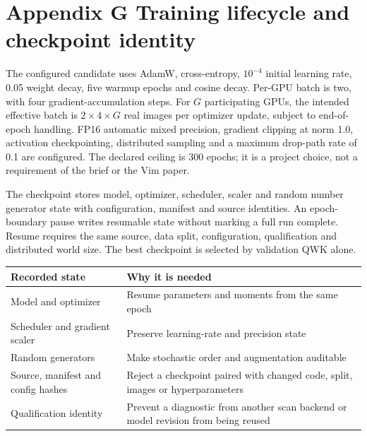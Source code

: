 \newpage
\section*{\color{ink}Appendix G \quad Training lifecycle and checkpoint identity}
The configured candidate uses AdamW, cross-entropy, $10^{-4}$ initial
learning rate, 0.05 weight decay, five warmup epochs and cosine decay.
Per-GPU batch is two, with four gradient-accumulation steps. For $G$
participating GPUs, the intended effective batch is $2\times4\times G$
real images per optimizer update, subject to end-of-epoch handling.
FP16 automatic mixed precision, gradient clipping at norm 1.0,
activation checkpointing, distributed sampling and a maximum drop-path
rate of 0.1 are configured. The declared ceiling is 300 epochs; it is a
project choice, not a requirement of the brief or the Vim paper.

\begin{center}
\end{center}

The checkpoint stores model, optimizer, scheduler, scaler and random
number generator state with configuration, manifest and source identities.
An epoch-boundary pause writes resumable state without marking a full run
complete. Resume requires the same source, data split, configuration,
qualification and distributed world size. The best checkpoint is selected
by validation QWK alone.

\small
\begin{tabularx}{\linewidth}{@{}p{.31\linewidth}Y@{}}
\toprule
Recorded state & Why it is needed\\
\midrule
Model and optimizer & Resume parameters and moments from the same epoch\\
Scheduler and gradient scaler & Preserve learning-rate and precision state\\
Random generators & Make stochastic order and augmentation auditable\\
Source, manifest and config hashes & Reject a checkpoint paired with
changed code, split, images or hyperparameters\\
Qualification identity & Prevent a diagnostic from another scan backend
or model revision from being reused\\
\bottomrule
\end{tabularx}
\normalsize

